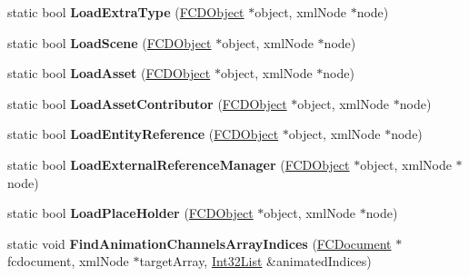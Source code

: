 \begin{DoxyCompactItemize}
\item 
\hypertarget{classFArchiveXML_a42482076998e2198f9a0425ff8dcc6dc}{
static bool {\bfseries LoadExtraType} (\hyperlink{classFCDObject}{FCDObject} $\ast$object, xmlNode $\ast$node)}
\label{classFArchiveXML_a42482076998e2198f9a0425ff8dcc6dc}

\item 
\hypertarget{classFArchiveXML_a5a49f5747b16985482ddc172fc81b734}{
static bool {\bfseries LoadScene} (\hyperlink{classFCDObject}{FCDObject} $\ast$object, xmlNode $\ast$node)}
\label{classFArchiveXML_a5a49f5747b16985482ddc172fc81b734}

\item 
\hypertarget{classFArchiveXML_a875e91a66a9b40641d083af3e8c9fe1b}{
static bool {\bfseries LoadAsset} (\hyperlink{classFCDObject}{FCDObject} $\ast$object, xmlNode $\ast$node)}
\label{classFArchiveXML_a875e91a66a9b40641d083af3e8c9fe1b}

\item 
\hypertarget{classFArchiveXML_a367c11921b7c1537718047064d1e5ffe}{
static bool {\bfseries LoadAssetContributor} (\hyperlink{classFCDObject}{FCDObject} $\ast$object, xmlNode $\ast$node)}
\label{classFArchiveXML_a367c11921b7c1537718047064d1e5ffe}

\item 
\hypertarget{classFArchiveXML_a8cadc7aba5cbef80ba1e0a05d566abdd}{
static bool {\bfseries LoadEntityReference} (\hyperlink{classFCDObject}{FCDObject} $\ast$object, xmlNode $\ast$node)}
\label{classFArchiveXML_a8cadc7aba5cbef80ba1e0a05d566abdd}

\item 
\hypertarget{classFArchiveXML_a957566c1300a2ab443077fb3cc554387}{
static bool {\bfseries LoadExternalReferenceManager} (\hyperlink{classFCDObject}{FCDObject} $\ast$object, xmlNode $\ast$node)}
\label{classFArchiveXML_a957566c1300a2ab443077fb3cc554387}

\item 
\hypertarget{classFArchiveXML_a6f9aa794147a5c59286711fe7245586a}{
static bool {\bfseries LoadPlaceHolder} (\hyperlink{classFCDObject}{FCDObject} $\ast$object, xmlNode $\ast$node)}
\label{classFArchiveXML_a6f9aa794147a5c59286711fe7245586a}

\item 
\hypertarget{classFArchiveXML_aad15689fbfca61712581151d2acb598e}{
static void {\bfseries FindAnimationChannelsArrayIndices} (\hyperlink{classFCDocument}{FCDocument} $\ast$fcdocument, xmlNode $\ast$targetArray, \hyperlink{classfm_1_1vector}{Int32List} \&animatedIndices)}
\label{classFArchiveXML_aad15689fbfca61712581151d2acb598e}


\end{DoxyCompactItemize}
